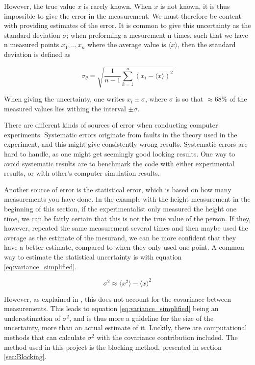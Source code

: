 \documentclass[norsk,a4paper,12pt]{article}
\begin{document}
However, the true value $x$ is rarely known. When $x$ is not known, it is thus impossible to give the error in the measurement. We must therefore be content with providing estimates of the error. It is common to give this uncertainty as the standard deviation $\sigma$; when preforming a mesurement n times, such that we have n measured points $x_1, .., x_n$ where the average value is $ \langle x \rangle $, then the standard deviation is defined as

\begin{equation}
\label{eq:standard_dev}
\sigma_{\theta} =  \sqrt{\frac{1}{n-1} \sum_{k=1}^n (x_i - \langle x \rangle)^2}
\end{equation}

When giving the uncertainty, one writes $x_i \pm \sigma$, where $\sigma$ is so that $\approx 68 \%$ of the measured values lies withing the interval $\pm \sigma$. 

There are different kinds of sources of error when conducting computer experiments. Systematic errors originate from faults in the theory used in the experiment, and this might give consistently wrong results. Systematic errors are hard to handle, as one might get seemingly good looking results. One way to avoid systematic results are to benchmark the code with either experimental results, or with other's computer simulation results. \par 
\vspace{3mm}
Another source of error is the statistical error, which is based on how many measurements you have done. In the example with the height measurement in the beginning of this section, if the experimentalist only measured the height one time, we can be fairly certain that this is not the true value of the person. If they, however, repeated the same measurement several times and then maybe used the average as the estimate of the mesurand, we can be more confident that they have a better estimate, compared to when they only used one point. A common way to estimate the statistical uncertainty is with equation \ref{eq:variance_simplified}.

\begin{equation}
\label{eq:variance_simplified}
\sigma^2 \approx \langle x^2 \rangle - \langle x \rangle^2
\end{equation}

However, as explained in \cite{Nordhagen}, this does not account for the covarinace between measurements. This leads to equation \ref{eq:variance_simplified} being an underestimation of $\sigma^2$, and is thus more a guideline for the size of the uncertainty, more than an actual estimate of it. Luckily, there are computational methods that can calculate $\sigma^2$ with the covariance contribution included. The method used in this project is the blocking method, presented in section \ref{sec:Blocking}.
\end{document}
